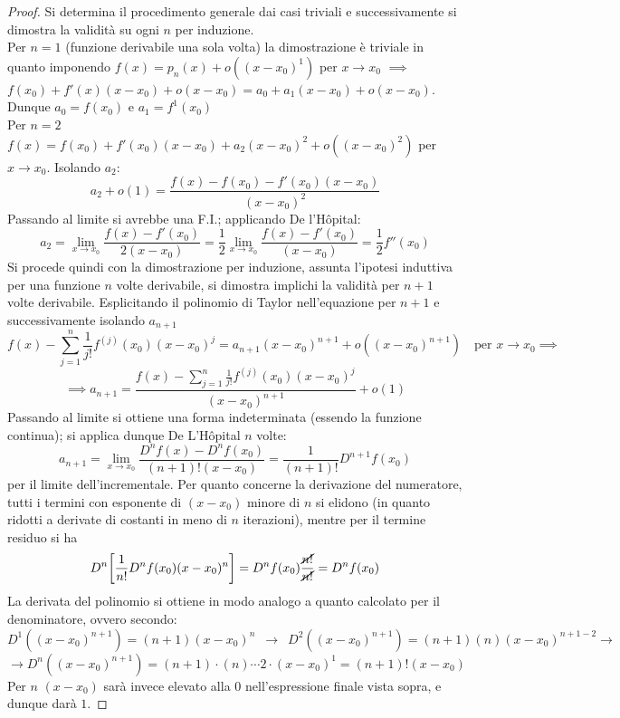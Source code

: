 \documentclass[10pt]{article}
\theoremstyle{plain}
\begin{document}
\begin{proof}
Si determina il procedimento generale dai casi triviali e successivamente si dimostra la validità su ogni $n$ per induzione.
\\Per $n = 1$ (funzione derivabile una sola volta) la dimostrazione è triviale in quanto imponendo $f(x) = p_n(x) + o ((x - x_0)^1)$ per $x \rightarrow x_0$ $\implies$ $f(x_0) + f'(x)(x-x_0) + o(x-x_0) = a_0 + a_1 (x-x_0) + o(x-x_0)$. Dunque $a_0 = f(x_0)$ e $a_1 = f^1(x_0)$
\\Per $n=2$ $f(x) = f(x_0) + f'(x_0) (x-x_0) + a_2 (x-x_0)^2 + o((x-x_0)^2)$ per $x \rightarrow x_0$. Isolando $a_2$:
\[a_2 + o(1) = \frac{f(x) - f(x_0) - f'(x_0) (x-x_0) }{(x - x_0)^2}\]
Passando al limite si avrebbe una F.I.; applicando De l'H\^opital:
\[a_2 = \lim \limits_{x \rightarrow x_0} \frac{f(x) - f'(x_0)}{2 (x - x_0)} = \frac{1}{2} \lim \limits_{x \rightarrow x_0} \frac{f(x) - f'(x_0)}{(x - x_0)} = \frac{1}{2}f''(x_0)\]
Si procede quindi con la dimostrazione per induzione, assunta l'ipotesi induttiva per una funzione $n$ volte derivabile, si dimostra implichi la validità per $n+1$ volte derivabile. Esplicitando il polinomio di Taylor nell'equazione per $n+1$ e successivamente isolando $a_{n+1}$
\[f(x)- \sum \limits_{j = 1}^n \frac{1}{j!}f^{(j)}(x_0) (x - x_0)^j = a_{n+1}(x - x_0)^{n+1} + o((x-x_0)^{n+1}) \quad \textrm{per } x \rightarrow x_0 \implies\] \[\implies a_{n+1} = \frac{f(x)- \sum \limits_{j = 1}^n \frac{1}{j!}f^{(j)}(x_0) (x - x_0)^j}{(x - x_0)^{n+1}} + o(1)\]
Passando al limite si ottiene una forma indeterminata (essendo la funzione continua); si applica dunque De L'H\^opital $n$ volte:
\[a_{n+1} = \lim \limits_{x \rightarrow x_0} \frac{D^nf(x) - D^nf(x_0)}{(n+1)!(x-x_0)} = \frac{1}{(n+1)!}D^{n+1}f(x_0)\]
per il limite dell'incrementale. Per quanto concerne la derivazione del numeratore, tutti i termini con esponente di $(x - x_0)$ minore di $n$ si elidono (in quanto ridotti a derivate di costanti in meno di $n$ iterazioni), mentre per il termine residuo si ha 
\[D^n \bigg[\frac{1}{n!}D^nf(x_0) (x-x_0)^n\bigg] = D^nf(x_0)\frac{\cancel{n!}}{\cancel{n!}} = D^nf(x_0)\]
La derivata del polinomio si ottiene in modo analogo a quanto calcolato per il denominatore, ovvero secondo:
\[D^1((x-x_0)^{n+1}) = (n+1) (x - x_0)^n \enspace \rightarrow \enspace D^2((x-x_0)^{n+1}) = (n+1)(n) (x - x_0)^{n+1-2} \rightarrow \] \[\rightarrow D^n((x-x_0)^{n+1}) = (n+1) \cdot (n) \cdots 2 \cdot (x - x_0)^1 = (n+1)!(x-x_0)\]
Per $n$ $(x - x_0)$ sarà invece elevato alla $0$ nell'espressione finale vista sopra, e dunque darà $1$.
\end{proof}
\end{document}
